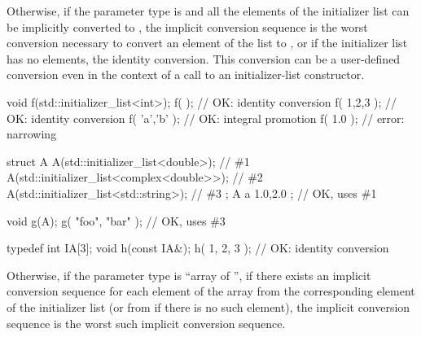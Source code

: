 \pnum
Otherwise, if the parameter type is 
and all the elements
of the initializer list can be implicitly converted to , the implicit
conversion sequence is the worst conversion necessary to convert an element of
the list to , or if the initializer list has no elements, the identity
conversion. This conversion can be a user-defined conversion even in
the context of a call to an initializer-list constructor. \begin{example}
\begin{codeblock}
void f(std::initializer_list<int>);
f( {} );                    // OK:  identity conversion
f( {1,2,3} );               // OK:  identity conversion
f( {'a','b'} );             // OK:  integral promotion
f( {1.0} );                 // error: narrowing

struct A {
  A(std::initializer_list<double>);           // \#1
  A(std::initializer_list<complex<double>>);  // \#2
  A(std::initializer_list<std::string>);      // \#3
};
A a{ 1.0,2.0 };             // OK, uses \#1

void g(A);
g({ "foo", "bar" });        // OK, uses \#3

typedef int IA[3];
void h(const IA&);
h({ 1, 2, 3 });             // OK: identity conversion
\end{codeblock}
\end{example}

\pnum
Otherwise, if the parameter type is ``array of  '',
if there exists an implicit conversion sequence for each element of the array
from the corresponding element of the initializer list (or from \tcode{\{\}}
if there is no such element), the implicit conversion sequence is
the worst such implicit conversion sequence.

